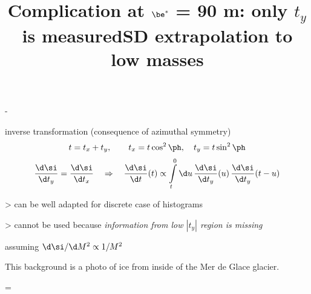 \advance\hsize-\horizontalmargin

\newpage %
\title{Complication at $\mathbf{\be^*}$ = 90 m: only $t_y$ is measured}


\> inverse transformation (consequence of azimuthal symmetry)
$$t = t_x + t_y,\qquad t_x = t\cos^2\ph,\quad t_y=t\sin^2\ph$$
$${\d\si\over\d t_y} = {\d\si\over\d t_x} \quad \Rightarrow \quad {\d\si\over\d t}(t) \propto \int\limits_t^0 \d u\, {\d\si\over\d t_y}(u)\, {\d\si\over\d t_y}(t - u)$$\par
\>> can be well adapted for discrete case of histograms\par
\vskip3mm
\>> cannot be used because \em{information from low $|t_y|$ region is missing}



\newpage %
\title{SD extrapolation to low masses}

\> assuming $\d\si/\d M^2 \propto 1/M^2$

\bls

\centerline{}

\newpage %
\centerline{This background is a photo of ice from inside of the Mer de Glace glacier.}
\footline={}

\vfil\eject\bye
